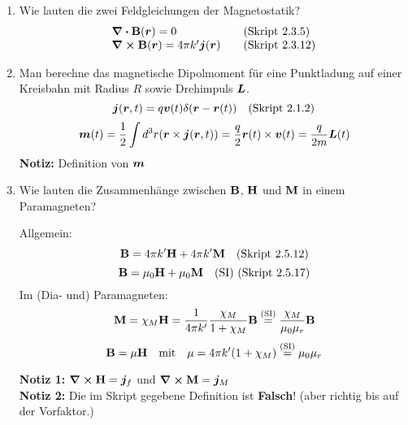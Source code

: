 \begin{enumerate}
  \item Wie lauten die zwei Feldgleichungen der Magnetostatik?
    \begin{equation*}
      \begin{array}{ll}
        \div \vb B(\vb* r) = 0&\quad\text{(Skript 2.3.5)}\\
        \curl \vb B(\vb* r)= 4\pi k'\vb* j(\vb* r)&\quad\text{(Skript 2.3.12)}
      \end{array}
    \end{equation*}

  \item Man berechne das magnetische Dipolmoment für eine Punktladung auf
        einer Kreisbahn mit Radius $R$ sowie Drehimpuls $\vb* L$.
        $$\vb* j(\vb* r,t)=q\vb* v(t)\delta(\vb* r-\vb* r(t))\quad\text{(Skript 2.1.2)}$$
        $$\vb* m(t) 
        = \frac{1}{2}\int d^3 r (\vb* r \times \vb* j(\vb* r,t))
        =\frac{q}{2}\vb* r(t)\times\vb* v(t)=\frac{q}{2m}\vb* L(t)$$
        \textbf{Notiz:} Definition von $\vb* m$ 

  \item Wie lauten die Zusammenhänge zwischen $\vb B$, $\vb H$ 
        und $\vb M$ in einem Paramagneten?

        Allgemein:
        $$\vb B = 4\pi k'\vb H + 4\pi k'\vb M\quad\text{(Skript 2.5.12)}$$
        $$\vb B = \mu_0 \vb H + \mu_0 \vb M \quad\text{(SI) 
        (Skript 2.5.17)}$$
        Im (Dia- und) Paramagneten:
        \begin{equation*}
            \vb M 
            = \chi_M \vb H 
            = \frac{1}{4\pi k'}\frac{\chi_M}{1+\chi_M} \vb B
            \stackrel{\text{(SI)}}= \frac{\chi_M}{\mu_0\mu_r} \vb B
        \end{equation*}
         \begin{equation*}
            \vb B = \mu \vb H \quad \text{mit}\quad
            \mu = 4\pi k'(1+\chi_M)
            \stackrel{\text{(SI)}}= {\mu_0\mu_r} 
         \end{equation*}
          \begin{center}
          \end{center}

        \textbf{Notiz 1:} $\displaystyle \curl \vb H = \vb* j_f$ und 
        $\displaystyle \curl \vb M=\vb* j_M$\\
        \textbf{Notiz 2:} Die im Skript gegebene Definition ist 
        \textbf{Falsch}! (aber richtig bis auf der Vorfaktor.)
\end{enumerate}
